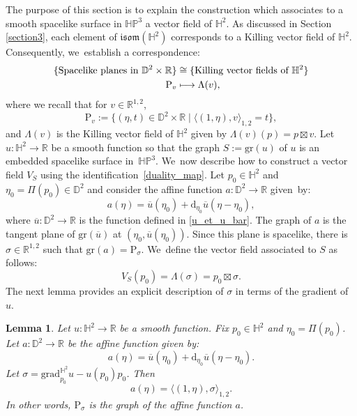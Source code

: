 \documentclass[11pt]{article}
\newcommand\mto{\mathchoice{\longmapsto}{\mapsto}{\mapsto}{\mapsto}}
\theoremstyle{plain}
\newtheorem{lemma}[cor]{Lemma}
\theoremstyle{definition}
\newcommand{\minko}{\mathbb{R}^{1,2}}
\newcommand{\HP}{\mathbb{HP}^3}
\newcommand{\grad}{\mathrm{grad}^{\mathbb{H}^2}}
\newcommand{\inner}[1] {\langle #1 \rangle}
\begin{document}
The purpose of this section is to explain the construction which associates to a smooth spacelike surface in $\HP$ a vector field of $\mathbb{H}^2$. As discussed in Section \ref{section3}, each element of $\mathfrak{isom}(\mathbb{H}^2)$ corresponds to a Killing vector field of $\mathbb{H}^2$. Consequently, we~establish a correspondence:
\begin{equation}\label{duality_map}
\begin{aligned}
\{\text{Spacelike planes in } \mathbb{D}^2\times\mathbb{R}\} & \cong \{\text{Killing vector fields of } \mathbb{H}^2\} \\
\mathrm{P}_v& \mto \Lambda(v),
\end{aligned}
\end{equation}
where we recall that for $v\in\minko$,
\[
\mathrm{P}_v:=\{(\eta,t)\in\mathbb{D}^2\times\mathbb{R} \mid \langle (1,\eta),v \rangle_{1,2}=t \},
\]
and $\Lambda(v)$ is the Killing vector field of $\mathbb{H}^2$ given by $\Lambda(v)(p)=p\boxtimes v$.
Let $u:\mathbb{H}^2\to \mathbb{R}$ be a smooth function so that the graph $S:=\mathrm{gr}(u)$ of $u$ is an embedded spacelike surface in~$\HP$. We~now describe how to construct a vector field $V_S$ using the identification~\eqref{duality_map}. Let $p_0\in\mathbb{H}^2$ and $\eta_0=\Pi(p_0)\in \mathbb{D}^2$ and consider the affine function $a:\mathbb{D}^2\to \mathbb{R}$ given~by:
\[
a(\eta)=\overline{u}(\eta_0)+\mathrm{d}_{\eta_0}\overline{u}(\eta-\eta_0),
\]
where $\overline{u}: \mathbb{D}^2 \to \mathbb{R}$ is the function defined in \eqref{u_et_u_bar}.
The graph of $a$ is the tangent plane of $\mathrm{gr}(\overline{u})$ at $(\eta_0,\overline{u}(\eta_0))$. Since this plane is spacelike, there is $\sigma\in\minko$ such that $\mathrm{gr}(a)=\mathrm{P}_{\sigma}$. We~define the vector field associated to $S$ as follows:
\begin{equation}\label{XS}
V_S(p_0)=\Lambda(\sigma)= p_0\boxtimes \sigma.
\end{equation}
The next lemma provides an explicit description of $\sigma$ in terms of the gradient of $u$.

\begin{lemma}\label{sigma_lemma}
Let $u:\mathbb{H}^2\to\mathbb{R}$ be a smooth function. Fix $p_0\in\mathbb{H}^2$ and $\eta_0=\Pi(p_0)$. Let $a:\mathbb{D}^2\to \mathbb{R}$ be the affine function given by:
\[
a(\eta)=\overline{u}(\eta_0)+\mathrm{d}_{\eta_0}\overline{u}(\eta-\eta_0).
\]
Let $\sigma=\grad_{p_0}u-u(p_0)p_0$. Then
\[
a(\eta)=\inner{(1,\eta),\sigma}_{1,2}.
\]
In other words, $\mathrm{P}_{\sigma}$ is the graph of the affine function $a$.
\end{lemma}
\end{document}
